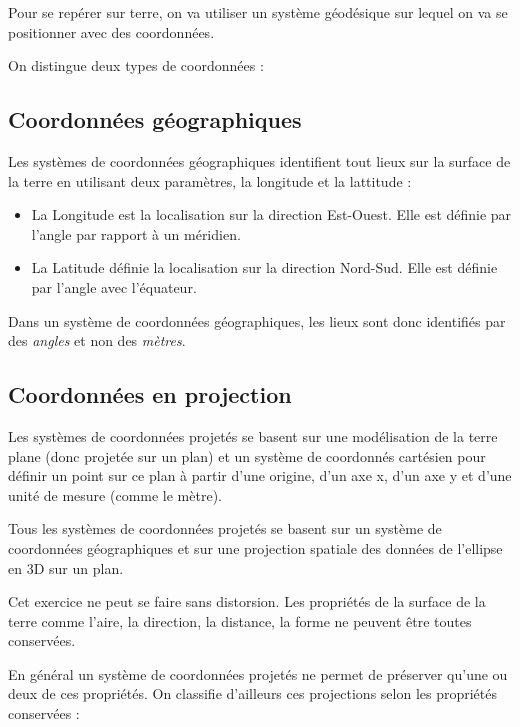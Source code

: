 \documentclass[
]{book}
\begin{document}
Pour se repérer sur terre, on va utiliser un système géodésique sur lequel on va se positionner avec des coordonnées.

On distingue deux types de coordonnées :

\hypertarget{coordonnuxe9es-guxe9ographiques}{%
\subsection{Coordonnées géographiques}\label{coordonnuxe9es-guxe9ographiques}}

Les systèmes de coordonnées géographiques identifient tout lieux sur la surface de la terre en utilisant deux paramètres, la longitude et la lattitude :

\begin{itemize}
\item
  La Longitude est la localisation sur la direction Est-Ouest. Elle est définie par l'angle par rapport à un méridien.
\item
  La Latitude définie la localisation sur la direction Nord-Sud. Elle est définie par l'angle avec l'équateur.
\end{itemize}

Dans un système de coordonnées géographiques, les lieux sont donc identifiés par des \emph{angles} et non des \emph{mètres}.

\hypertarget{coordonnuxe9es-en-projection}{%
\subsection{Coordonnées en projection}\label{coordonnuxe9es-en-projection}}

Les systèmes de coordonnées projetés se basent sur une modélisation de la terre plane (donc projetée sur un plan) et un système de coordonnés cartésien pour définir un point sur ce plan à partir d'une origine, d'un axe x, d'un axe y et d'une unité de mesure (comme le mètre).

Tous les systèmes de coordonnées projetés se basent sur un système de coordonnées géographiques et sur une projection spatiale des données de l'ellipse en 3D sur un plan.

Cet exercice ne peut se faire sans distorsion. Les propriétés de la surface de la terre comme l'aire, la direction, la distance, la forme ne peuvent être toutes conservées.

En général un système de coordonnées projetés ne permet de préserver qu'une ou deux de ces propriétés. On classifie d'ailleurs ces projections selon les propriétés conservées :
\end{document}
